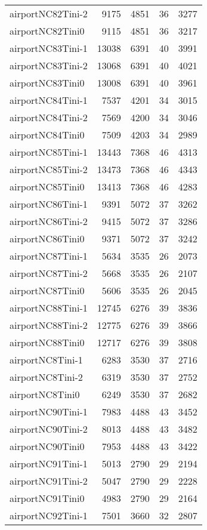 \begin{longtable}{lrrrr}
airportNC82Tini-2 & 9175 & 4851 & 36 & 3277 \\
airportNC82Tini0 & 9115 & 4851 & 36 & 3217 \\
airportNC83Tini-1 & 13038 & 6391 & 40 & 3991 \\
airportNC83Tini-2 & 13068 & 6391 & 40 & 4021 \\
airportNC83Tini0 & 13008 & 6391 & 40 & 3961 \\
airportNC84Tini-1 & 7537 & 4201 & 34 & 3015 \\
airportNC84Tini-2 & 7569 & 4200 & 34 & 3046 \\
airportNC84Tini0 & 7509 & 4203 & 34 & 2989 \\
airportNC85Tini-1 & 13443 & 7368 & 46 & 4313 \\
airportNC85Tini-2 & 13473 & 7368 & 46 & 4343 \\
airportNC85Tini0 & 13413 & 7368 & 46 & 4283 \\
airportNC86Tini-1 & 9391 & 5072 & 37 & 3262 \\
airportNC86Tini-2 & 9415 & 5072 & 37 & 3286 \\
airportNC86Tini0 & 9371 & 5072 & 37 & 3242 \\
airportNC87Tini-1 & 5634 & 3535 & 26 & 2073 \\
airportNC87Tini-2 & 5668 & 3535 & 26 & 2107 \\
airportNC87Tini0 & 5606 & 3535 & 26 & 2045 \\
airportNC88Tini-1 & 12745 & 6276 & 39 & 3836 \\
airportNC88Tini-2 & 12775 & 6276 & 39 & 3866 \\
airportNC88Tini0 & 12717 & 6276 & 39 & 3808 \\
airportNC8Tini-1 & 6283 & 3530 & 37 & 2716 \\
airportNC8Tini-2 & 6319 & 3530 & 37 & 2752 \\
airportNC8Tini0 & 6249 & 3530 & 37 & 2682 \\
airportNC90Tini-1 & 7983 & 4488 & 43 & 3452 \\
airportNC90Tini-2 & 8013 & 4488 & 43 & 3482 \\
airportNC90Tini0 & 7953 & 4488 & 43 & 3422 \\
airportNC91Tini-1 & 5013 & 2790 & 29 & 2194 \\
airportNC91Tini-2 & 5047 & 2790 & 29 & 2228 \\
airportNC91Tini0 & 4983 & 2790 & 29 & 2164 \\
airportNC92Tini-1 & 7501 & 3660 & 32 & 2807 \\

\end{longtable}
